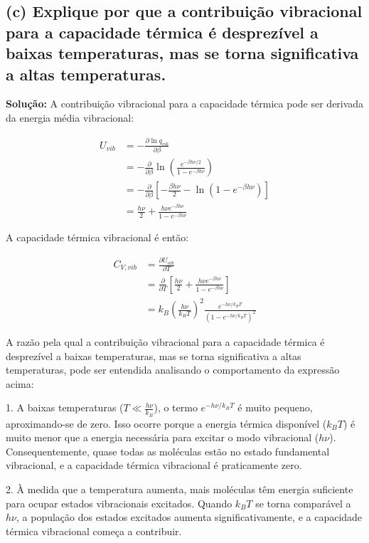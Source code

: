 \documentclass[fleqn,a4paper]{article}
\begin{document}
\subsection*{(c) Explique por que a contribuição vibracional para a capacidade térmica é desprezível a baixas temperaturas, mas se torna significativa a altas temperaturas.}

\textbf{Solução:}
A contribuição vibracional para a capacidade térmica pode ser derivada da energia média vibracional:

\begin{align}
U_{vib} &= -\frac{\partial \ln q_{vib}}{\partial \beta} \\
&= -\frac{\partial}{\partial \beta} \ln \left(\frac{e^{-\beta h\nu/2}}{1-e^{-\beta h\nu}}\right) \\
&= -\frac{\partial}{\partial \beta} \left[-\frac{\beta h\nu}{2} - \ln(1-e^{-\beta h\nu})\right] \\
&= \frac{h\nu}{2} + \frac{h\nu e^{-\beta h\nu}}{1-e^{-\beta h\nu}}
\end{align}

A capacidade térmica vibracional é então:

\begin{align}
C_{V,vib} &= \frac{\partial U_{vib}}{\partial T} \\
&= \frac{\partial}{\partial T} \left[\frac{h\nu}{2} + \frac{h\nu e^{-\beta h\nu}}{1-e^{-\beta h\nu}}\right] \\
&= k_B \left(\frac{h\nu}{k_B T}\right)^2 \frac{e^{-h\nu/k_B T}}{(1-e^{-h\nu/k_B T})^2}
\end{align}

A razão pela qual a contribuição vibracional para a capacidade térmica é desprezível a baixas temperaturas, mas se torna significativa a altas temperaturas, pode ser entendida analisando o comportamento da expressão acima:

1. A baixas temperaturas ($T \ll \frac{h\nu}{k_B}$), o termo $e^{-h\nu/k_B T}$ é muito pequeno, aproximando-se de zero. Isso ocorre porque a energia térmica disponível ($k_B T$) é muito menor que a energia necessária para excitar o modo vibracional ($h\nu$). Consequentemente, quase todas as moléculas estão no estado fundamental vibracional, e a capacidade térmica vibracional é praticamente zero.

2. À medida que a temperatura aumenta, mais moléculas têm energia suficiente para ocupar estados vibracionais excitados. Quando $k_B T$ se torna comparável a $h\nu$, a população dos estados excitados aumenta significativamente, e a capacidade térmica vibracional começa a contribuir.
\end{document}
